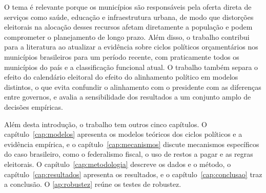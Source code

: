 O tema é relevante porque os municípios são responsáveis pela oferta direta de serviços como saúde, educação e infraestrutura urbana, de modo que distorções eleitorais na alocação desses recursos afetam diretamente a população e podem comprometer o planejamento de longo prazo. Além disso, o trabalho contribui para a literatura ao atualizar a evidência sobre ciclos políticos orçamentários nos municípios brasileiros para um período recente, com praticamente todos os municípios do país e a classificação funcional atual. O trabalho também separa o efeito do calendário eleitoral do efeito do alinhamento político em modelos distintos, o que evita confundir o alinhamento com o presidente com as diferenças entre governos, e avalia a sensibilidade dos resultados a um conjunto amplo de decisões empíricas.

Além desta introdução, o trabalho tem outros cinco capítulos. O capítulo~\ref{cap:modelos} apresenta os modelos teóricos dos ciclos políticos e a evidência empírica, e o capítulo~\ref{cap:mecanismos} discute mecanismos específicos do caso brasileiro, como o federalismo fiscal, o uso de restos a pagar e as regras eleitorais. O capítulo~\ref{cap:metodologia} descreve os dados e o método, o capítulo~\ref{cap:resultados} apresenta os resultados, e o capítulo~\ref{cap:conclusao} traz a conclusão. O \autoref{ap:robustez} reúne os testes de robustez.
